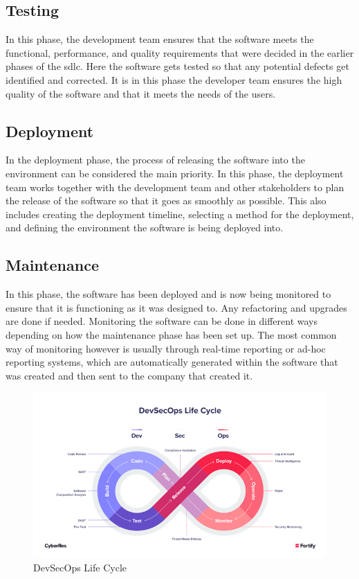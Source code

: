 \subsection{Testing}
In this phase, the development team ensures that the software meets the functional, performance, and quality requirements that were decided in the earlier phases of the \acrshort{sdlc}. Here the software gets tested so that any potential defects get identified and corrected. It is in this phase the developer team ensures the high quality of the software and that it meets the needs of the users. \cite{TestingSDLC}
 
\subsection{Deployment}
In the deployment phase, the process of releasing the software into the environment can be considered the main priority. In this phase, the deployment team works together with the development team and other stakeholders to plan the release of the software so that it goes as smoothly as possible. This also includes creating the deployment timeline, selecting a method for the deployment, and defining the environment the software is being deployed into. \cite{DeploymentSDLC}

\subsection{Maintenance} 
In this phase, the software has been deployed and is now being monitored to ensure that it is functioning as it was designed to. Any refactoring and upgrades are done if needed. Monitoring the software can be done in different ways depending on how the maintenance phase has been set up. The most common way of monitoring however is usually through real-time reporting or ad-hoc reporting systems, which are automatically generated within the software that was created and then sent to the company that created it.\cite{MaintenanceSDLC} 


\begin{figure}[H]
    \centering
    \includegraphics[width=0.8\columnwidth]{Images/devsec.png}
    \caption{DevSecOps Life Cycle}
    \label{fig: DevSecOps Life Cycle}
\end{figure}


